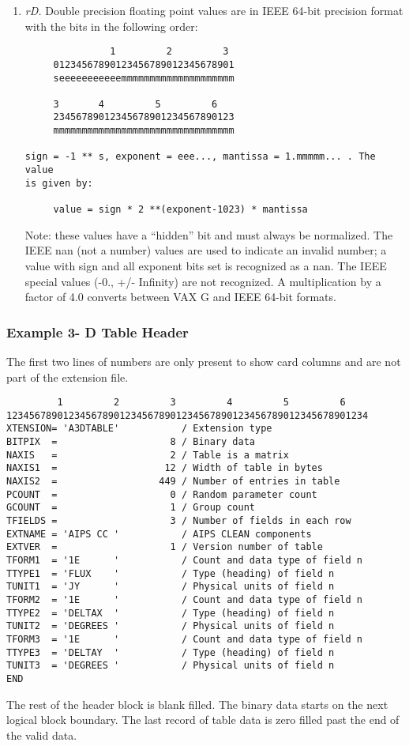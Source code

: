 \begin{enumerate}
\item {\it rD.}  Double precision floating point values are in IEEE 64-bit
precision format with the bits in the following order:

\begin{verbatim}
               1         2         3
     01234567890123456789012345678901
     seeeeeeeeeeemmmmmmmmmmmmmmmmmmmm

     3       4         5         6
     23456789012345678901234567890123
     mmmmmmmmmmmmmmmmmmmmmmmmmmmmmmmm

sign = -1 ** s, exponent = eee..., mantissa = 1.mmmmm... . The value
is given by:

     value = sign * 2 **(exponent-1023) * mantissa

\end{verbatim}
Note: these values have a ``hidden'' bit and must always be
normalized.  The IEEE nan (not a number) values are used to indicate
an invalid number; a value with sign and all exponent bits set is
recognized as a nan.
The IEEE special values (-0., +/- Infinity) are not recognized. A
multiplication by a factor of 4.0 converts between VAX G and IEEE
64-bit formats.
\end{enumerate} %

\subsubsection{Example 3- D Table Header }
The first two lines of numbers are only present to show card columns
and are not part of the extension file.

\begin{verbatim}
         1         2         3         4         5         6
1234567890123456789012345678901234567890123456789012345678901234
XTENSION= 'A3DTABLE'           / Extension type
BITPIX  =                    8 / Binary data
NAXIS   =                    2 / Table is a matrix
NAXIS1  =                   12 / Width of table in bytes
NAXIS2  =                  449 / Number of entries in table
PCOUNT  =                    0 / Random parameter count
GCOUNT  =                    1 / Group count
TFIELDS =                    3 / Number of fields in each row
EXTNAME = 'AIPS CC '           / AIPS CLEAN components
EXTVER  =                    1 / Version number of table
TFORM1  = '1E      '           / Count and data type of field n
TTYPE1  = 'FLUX    '           / Type (heading) of field n
TUNIT1  = 'JY      '           / Physical units of field n
TFORM2  = '1E      '           / Count and data type of field n
TTYPE2  = 'DELTAX  '           / Type (heading) of field n
TUNIT2  = 'DEGREES '           / Physical units of field n
TFORM3  = '1E      '           / Count and data type of field n
TTYPE3  = 'DELTAY  '           / Type (heading) of field n
TUNIT3  = 'DEGREES '           / Physical units of field n
END

\end{verbatim}
The rest of the header block is blank filled. The binary data starts
on the next logical block boundary. The last record of table data is
zero filled past the end of the valid data.

